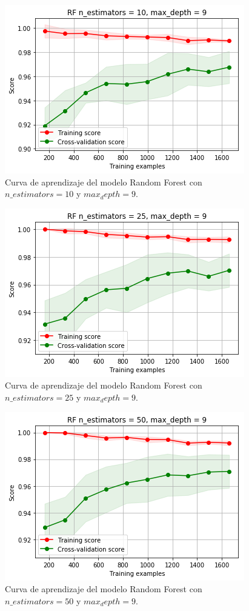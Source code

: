 \documentclass[11pt,a4paper]{article}
\begin{document}
\begin{figure}[H]
    \centering
    \includegraphics[scale=0.7]{img/lc-rf-n-10-d-9.png}
    \caption{Curva de aprendizaje del modelo Random Forest con $n\_estimators=10$ y $max_depth=9$.}
    \label{fig:lc-rf-n-10-d-9}
\end{figure}

\begin{figure}[H]
    \centering
    \includegraphics[scale=0.7]{img/lc-rf-n-25-d-9.png}
    \caption{Curva de aprendizaje del modelo Random Forest con $n\_estimators=25$ y $max_depth=9$.}
    \label{fig:lc-rf-n-25-d-9}
\end{figure}

\begin{figure}[H]
    \centering
    \includegraphics[scale=0.7]{img/lc-rf-n-50-d-9.png}
    \caption{Curva de aprendizaje del modelo Random Forest con $n\_estimators=50$ y $max_depth=9$.}
    \label{fig:lc-rf-n-50-d-9}
\end{figure}
\end{document}
